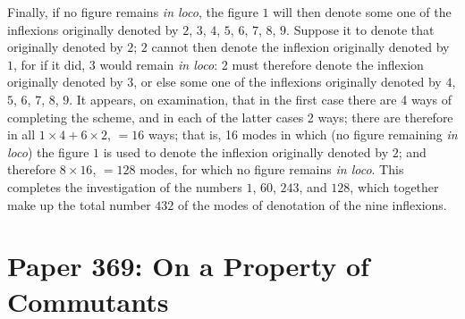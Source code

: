 \documentclass[11pt]{article}
\begin{document}
Finally, if no figure remains \emph{in loco}, the figure $1$ will then denote some one of the inflexions originally denoted by $2$, $3$, $4$, $5$, $6$, $7$, $8$, $9$. Suppose it to denote that originally denoted by $2$; $2$ cannot then denote the inflexion originally denoted by $1$, for if it did, $3$ would remain \emph{in loco}: $2$ must therefore denote the inflexion originally denoted by $3$, or else some one of the inflexions originally denoted by $4$, $5$, $6$, $7$, $8$, $9$. It appears, on examination, that in the first case there are 4 ways of completing the scheme, and in each of the latter cases 2 ways; there are therefore in all $1 \times 4 + 6 \times 2$, $=16$ ways; that is, 16 modes in which (no figure remaining \emph{in loco}) the figure $1$ is used to denote the inflexion originally denoted by $2$; and therefore $8 \times 16$, $=128$ modes, for which no figure remains \emph{in loco}. This completes the investigation of the numbers $1$, $60$, $243$, and $128$, which together make up the total number $432$ of the modes of denotation of the nine inflexions.

\newpage

\section*{Paper 369: On a Property of Commutants}

\medskip{}
\end{document}
